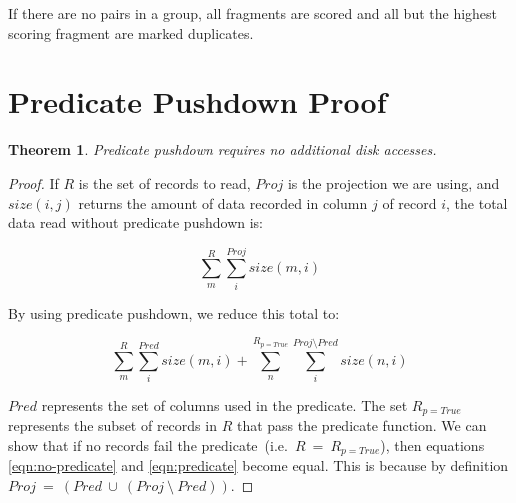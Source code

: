 \documentclass[10pt,twocolumn]{article}
\theoremstyle{plain}
\begin{document}
If there are no pairs in a group, all fragments are scored and all but the highest scoring fragment
are marked duplicates.

\section{Predicate Pushdown Proof}

\newtheorem{predicate-read-conserving}{Theorem}

\begin{predicate-read-conserving}
Predicate pushdown requires no additional disk accesses.
\end{predicate-read-conserving}

\begin{proof}

If $R$ is the set of records to read, $Proj$ is the projection we are using, and $size(i,j)$ returns the amount
of data recorded in column $j$ of record $i$, the total data read without predicate pushdown is:

\begin{equation}
\label{eqn:no-predicate}
\sum_{m}^{R}{\sum_{i}^{Proj}size(m,i)}
\end{equation}

By using predicate pushdown, we reduce this total to:

\begin{equation}
\label{eqn:predicate}
\sum_{m}^{R}{\sum_{i}^{Pred}size(m,i)} + \sum_{n}^{R_{p=True}}{\sum_{i}^{Proj \setminus Pred}size(n,i)}
\end{equation}

$Pred$ represents the set of columns used in the predicate. The set $R_{p=True}$ represents the subset of records in $R$ that pass
the predicate function. We can show that  if no records fail the predicate~(i.e.~$R~=~R_{p=True}$), then equations \ref{eqn:no-predicate}
and \ref{eqn:predicate} become equal. This is because by definition $Proj~=~(Pred~\cup~(Proj~\setminus~Pred))$.

\end{proof}





\clearpage
\end{document}
